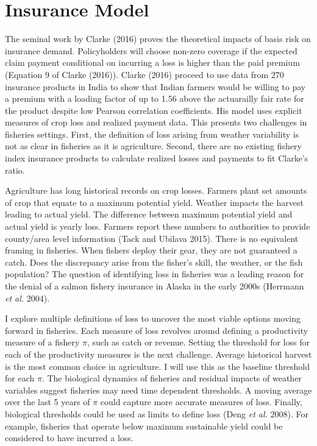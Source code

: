 \documentclass[
  letterpaper,
  DIV=11,
  numbers=noendperiod]{scrartcl}
\begin{document}
\hypertarget{sec-model}{%
\section{Insurance Model}\label{sec-model}}

The seminal work by Clarke (2016) proves the theoretical impacts of
basis risk on insurance demand. Policyholders will choose non-zero
coverage if the expected claim payment conditional on incurring a loss
is higher than the paid premium (Equation 9 of Clarke (2016)). Clarke
(2016) proceed to use data from 270 insurance products in India to show
that Indian farmers would be willing to pay a premium with a loading
factor of up to 1.56 above the actuarailly fair rate for the product
despite low Pearson correlation coefficients. His model uses explicit
measures of crop loss and realized payment data. This presents two
challenges in fisheries settings. First, the definition of loss arising
from weather variability is not as clear in fisheries as it is
agriculture. Second, there are no existing fishery index insurance
products to calculate realized losses and payments to fit Clarke's
ratio.

Agriculture has long historical records on crop losses. Farmers plant
set amounts of crop that equate to a maximum potential yield. Weather
impacts the harvest leading to actual yield. The difference between
maximum potential yield and actual yield is yearly loss. Farmers report
these numbers to authorities to provide county/area level information
(Tack and Ubilava 2015). There is no equivalent framing in fisheries.
When fishers deploy their gear, they are not guaranteed a catch. Does
the discrepancy arise from the fisher's skill, the weather, or the fish
population? The question of identifying loss in fisheries was a leading
reason for the denial of a salmon fishery insurance in Alaska in the
early 2000s (Herrmann \emph{et al.} 2004).

I explore multiple definitions of loss to uncover the most viable
options moving forward in fisheries. Each measure of loss revolves
around defining a productivity measure of a fishery \(\pi\), such as
catch or revenue. Setting the threshold for loss for each of the
productivity measures is the next challenge. Average historical harvest
is the most common choice in agriculture. I will use this as the
baseline threshold for each \(\pi\). The biological dynamics of
fisheries and residual impacts of weather variables suggest fisheries
may need time dependent thresholds. A moving average over the last 5
years of \(\pi\) could capture more accurate measures of loss. Finally,
biological thresholds could be used as limits to define loss (Deng
\emph{et al.} 2008). For example, fisheries that operate below maximum
sustainable yield could be considered to have incurred a loss.
\end{document}
